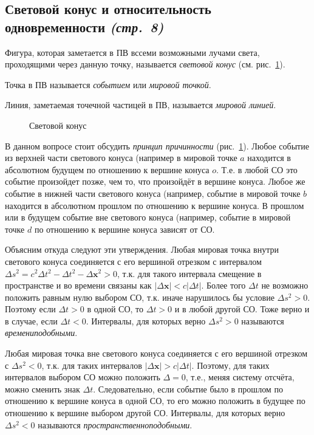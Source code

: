 \documentclass[a4paper,12pt]{article}
\begin{document}
\subsection{Световой конус и относительность одновременности \emph{(стр.~8)}}
\begin{dfn}
	Фигура, которая заметается в ПВ вссеми возможными лучами света,
	проходящими через данную точку, называется \emph{световой конус} 
	(см. рис.~\ref{fig:1}).
\end{dfn}
\begin{dfn}
	Точка в ПВ называется \emph{событием} или \emph{мировой точкой}.
\end{dfn}
\begin{dfn}
	Линия, заметаемая точечной частицей в ПВ, называется \emph{мировой линией}.
\end{dfn}
\begin{figure}[ht]
    \centering
    \caption{Световой конус}
    \label{fig:1}
\end{figure}
В данном вопросе стоит обсудить \emph{принцип причинности} (рис.~\ref{fig:1}).
Любое событие из верхней части светового конуса (например в мировой точке $a$ 
находится в абсолютном будущем по отношению к вершине конуса $o$. Т.\:е. в
любой СО это событие произойдет позже, чем то, что произойдёт в вершине конуса.
Любое же событие в нижней части светового конуса (например, событие в мировой
точке $b$ находится в абсолютном прошлом по отношению к вершине конуса. В
прошлом или в будущем событие вне светового конуса (например, событие в
мировой точке  $d$ по отношению к вершине конуса зависят от СО.

Объясним откуда следуют эти утверждения. Любая мировая точка внутри светового
конуса соединяется с его вершиной отрезком с интервалом $\Delta s^2=c^2 \Delta t^2- \Delta
t^2- \Delta \mathbf{x}^2 >0$, т.\:к. для такого интервала смещение в пространстве
и во времени связаны как $|\Delta \mathbf{x}|<c|\Delta t|$. Более того
$\Delta t$ не возможно положить равным нулю выбором СО,  т.\:к. иначе нарушилось
бы условие $\Delta s^2 >0$. Поэтому если $\Delta t>0$ в одной СО, то
$\Delta t >0$ и в любой другой СО. Тоже верно и в случае, если  $\Delta t<0$.
Интервалы, для которых верно  $\Delta s^2>0$ называются  \emph{времениподобными}.

Любая мировая точка вне светового конуса соединяется с его вершиной отрезком
с $\Delta s^2 <0$,  т.\:к. для таких интервалов $|\Delta \mathbf{x}|>c |\Delta t|$.
Поэтому, для таких интервалов выбором СО можно положить $\Delta =0$,  т.\:е.,
меняя систему отсчёта, можно сменить знак $\Delta t$. Следовательно, если
событие было в прошлом по отношению к вершине конуса в одной СО, то его можно
положить в будущее по отношению к вершине выбором другой СО. Интервалы, для
которых верно $\Delta s^2 <0$ называются  \emph{пространственноподобными}.
\end{document}
